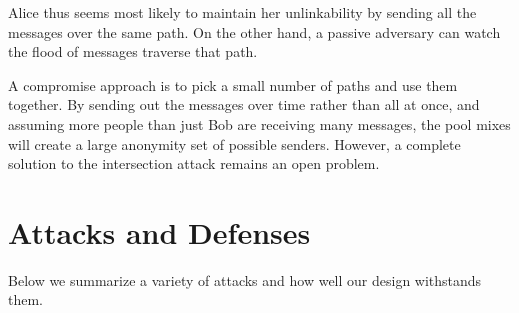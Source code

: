 \documentclass[11pt]{IEEEtran}
\begin{document}
Alice thus seems most likely to maintain her unlinkability by sending all
the messages over the same path. On the other hand, a passive adversary
can watch the flood of messages traverse that path.

A compromise approach is to pick a small number of paths and use them
together. By sending out the messages over time rather than all at once,
and assuming more people than just Bob are receiving many messages,
the pool mixes will create a large anonymity set of possible senders.
However, a complete solution to the intersection attack remains an
open problem.





\section{Attacks and Defenses}
\label{sec:attacks}

Below we summarize a variety of attacks and how well our design withstands
them.
\end{document}
